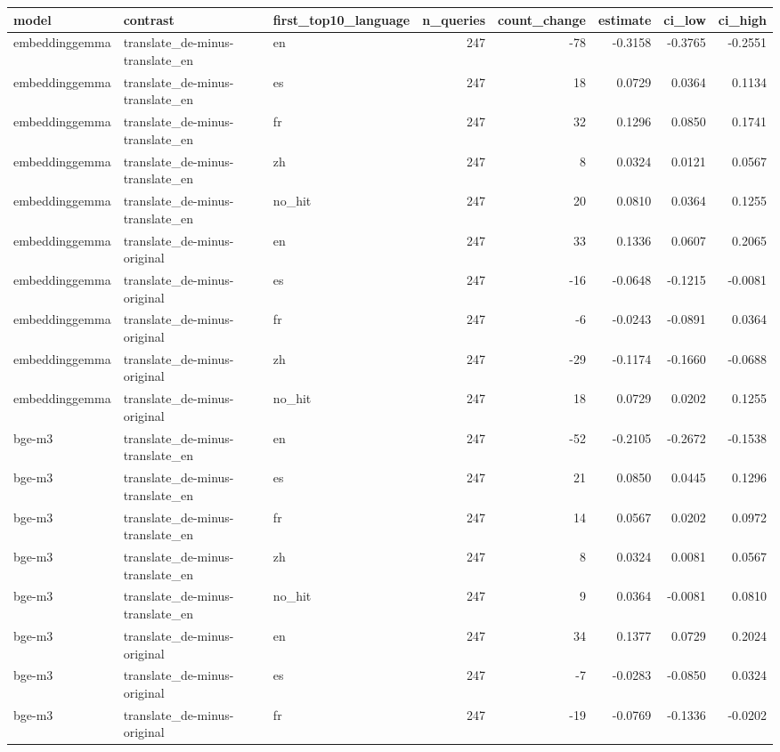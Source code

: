 \begin{tabular}{lllrrrrr}
\toprule
model & contrast & first\_top10\_language & n\_queries & count\_change & estimate & ci\_low & ci\_high \\
\midrule
embeddinggemma & translate\_de-minus-translate\_en & en & 247 & -78 & -0.3158 & -0.3765 & -0.2551 \\
embeddinggemma & translate\_de-minus-translate\_en & es & 247 & 18 & 0.0729 & 0.0364 & 0.1134 \\
embeddinggemma & translate\_de-minus-translate\_en & fr & 247 & 32 & 0.1296 & 0.0850 & 0.1741 \\
embeddinggemma & translate\_de-minus-translate\_en & zh & 247 & 8 & 0.0324 & 0.0121 & 0.0567 \\
embeddinggemma & translate\_de-minus-translate\_en & no\_hit & 247 & 20 & 0.0810 & 0.0364 & 0.1255 \\
embeddinggemma & translate\_de-minus-original & en & 247 & 33 & 0.1336 & 0.0607 & 0.2065 \\
embeddinggemma & translate\_de-minus-original & es & 247 & -16 & -0.0648 & -0.1215 & -0.0081 \\
embeddinggemma & translate\_de-minus-original & fr & 247 & -6 & -0.0243 & -0.0891 & 0.0364 \\
embeddinggemma & translate\_de-minus-original & zh & 247 & -29 & -0.1174 & -0.1660 & -0.0688 \\
embeddinggemma & translate\_de-minus-original & no\_hit & 247 & 18 & 0.0729 & 0.0202 & 0.1255 \\
bge-m3 & translate\_de-minus-translate\_en & en & 247 & -52 & -0.2105 & -0.2672 & -0.1538 \\
bge-m3 & translate\_de-minus-translate\_en & es & 247 & 21 & 0.0850 & 0.0445 & 0.1296 \\
bge-m3 & translate\_de-minus-translate\_en & fr & 247 & 14 & 0.0567 & 0.0202 & 0.0972 \\
bge-m3 & translate\_de-minus-translate\_en & zh & 247 & 8 & 0.0324 & 0.0081 & 0.0567 \\
bge-m3 & translate\_de-minus-translate\_en & no\_hit & 247 & 9 & 0.0364 & -0.0081 & 0.0810 \\
bge-m3 & translate\_de-minus-original & en & 247 & 34 & 0.1377 & 0.0729 & 0.2024 \\
bge-m3 & translate\_de-minus-original & es & 247 & -7 & -0.0283 & -0.0850 & 0.0324 \\
bge-m3 & translate\_de-minus-original & fr & 247 & -19 & -0.0769 & -0.1336 & -0.0202 \\

\end{tabular}
